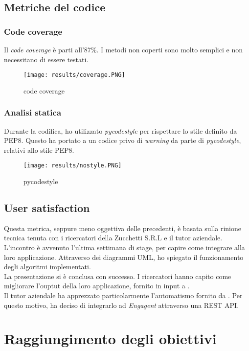 \subsection{Metriche del codice}
\subsubsection*{Code coverage}
Il \textit{code coverage} è parti all'87\%. I metodi non coperti sono molto semplici e non necessitano di essere testati. 
\begin{figure}[H]
    \centering
    \texttt{[image: results/coverage.PNG]} 
    \caption{code coverage}
    \label{coverage}
\end{figure}
\subsubsection*{Analisi statica}
Durante la codifica, ho utilizzato \textit{pycodestyle} per rispettare lo stile definito da PEP8. Questo ha portato a un codice privo di \textit{warning} da parte di \textit{pycodestyle}, relativi allo stile PEP8.
\begin{figure}[H]
    \centering
    \texttt{[image: results/nostyle.PNG]} 
    \caption{pycodestyle}
    \label{coverage}
\end{figure}

\subsection{User satisfaction}
Questa metrica, seppure meno oggettiva delle precedenti, è basata sulla rinione tecnica tenuta con i ricercatori della Zucchetti S.R.L e il tutor aziendale.\\
L'incontro è avvenuto l'ultima settimana di stage, per capire come integrare {\app} alla loro applicazione. Attraverso dei diagrammi UML, ho spiegato il funzionamento degli algoritmi implementati.\\
La presentazione si è conclusa con successo. I ricercatori hanno capito come migliorare l'ouptut della loro applicazione, fornito in input a {\app}.\\
Il tutor aziendale ha apprezzato particolarmente l'automatismo fornito da {\app}. Per questo motivo, ha deciso di integrarlo ad \textit{Engagent} attraverso una REST API.
\section{Raggiungimento degli obiettivi}

